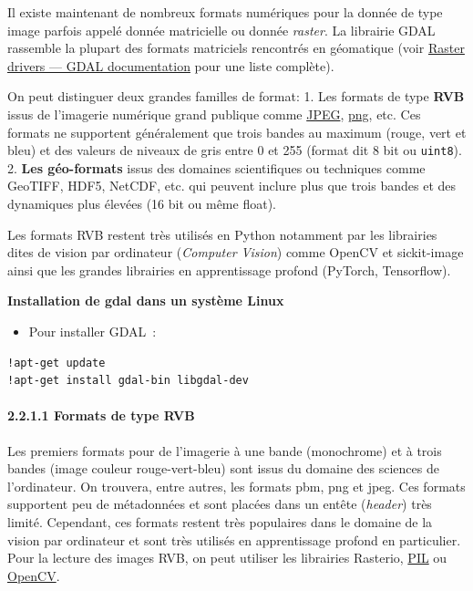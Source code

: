\documentclass[
]{article}
\providecommand{\tightlist}{%
  \setlength{\itemsep}{0pt}\setlength{\parskip}{0pt}}
\begin{document}
Il existe maintenant de nombreux formats numériques pour la donnée de
type image parfois appelé donnée matricielle ou donnée \emph{raster}. La
librairie GDAL rassemble la plupart des formats matriciels rencontrés en
géomatique (voir
\href{https://gdal.org/en/latest/drivers/raster/index.html}{Raster
drivers --- GDAL documentation} pour une liste complète).

On peut distinguer deux grandes familles de format: 1. Les formats de
type \textbf{RVB} issus de l'imagerie numérique grand publique comme
\href{https://gdal.org/en/latest/drivers/raster/jpeg.html\#raster-jpeg}{JPEG},
\href{https://gdal.org/en/latest/drivers/raster/png.html\#raster-png}{png},
etc. Ces formats ne supportent généralement que trois bandes au maximum
(rouge, vert et bleu) et des valeurs de niveaux de gris entre 0 et 255
(format dit 8 bit ou \texttt{uint8}). 2. \textbf{Les géo-formats} issus
des domaines scientifiques ou techniques comme GeoTIFF, HDF5, NetCDF,
etc. qui peuvent inclure plus que trois bandes et des dynamiques plus
élevées (16 bit ou même float).

Les formats RVB restent très utilisés en Python notamment par les
librairies dites de vision par ordinateur (\emph{Computer Vision}) comme
OpenCV et sickit-image ainsi que les grandes librairies en apprentissage
profond (PyTorch, Tensorflow).

\textbf{Installation de gdal dans un système Linux}

\begin{itemize}
\tightlist
\item
  Pour installer GDAL~:
\end{itemize}

\begin{verbatim}
!apt-get update
!apt-get install gdal-bin libgdal-dev
\end{verbatim}

\paragraph{\texorpdfstring{{2.2.1.1} Formats de type
RVB}{2.2.1.1 Formats de type RVB}}\label{formats-de-type-rvb}

Les premiers formats pour de l'imagerie à une bande (monochrome) et à
trois bandes (image couleur rouge-vert-bleu) sont issus du domaine des
sciences de l'ordinateur. On trouvera, entre autres, les formats pbm,
png et jpeg. Ces formats supportent peu de métadonnées et sont placées
dans un entête (\emph{header}) très limité. Cependant, ces formats
restent très populaires dans le domaine de la vision par ordinateur et
sont très utilisés en apprentissage profond en particulier. Pour la
lecture des images RVB, on peut utiliser les librairies Rasterio,
\href{https://he-arc.github.io/livre-python/pillow/index.html}{PIL} ou
\href{https://docs.opencv.org/4.10.0/index.html}{OpenCV}.
\end{document}
